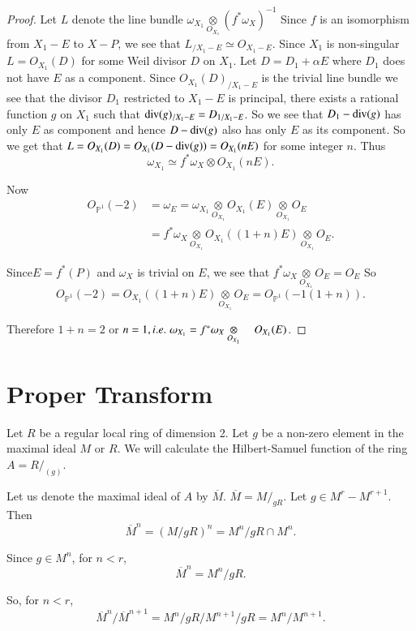 \begin{proof}
Let $L$ denote the line bundle
$\omega_{X_1}\underset{O_{X_1}}{\otimes}(f^*\omega_X)^{-1}$ Since $f$
is an isomorphism from $X_1-E$ to $X-P$, we see that $L_{/X_1-E}\simeq
O_{X_1-E}$. Since $X_1$ is non-singular $L=O_{X_1}(D)$ for some Weil
divisor $D$ on $X_1$. Let $D=D_1+\alpha E$ where $D_1$ does not have
$E$ as a component. Since $O_{X_1}(D)_{/X_1-E}$ is the trivial line
bundle we see that the divisor $D_1$ restricted to $X_1-E$ is
principal, \ie there exists a rational function $g$ on $X_1$ such that
$\operatorname{div}(g)_{/X_1-E}=D_{1/X_1-E}$. So we see that $D_1-\operatorname{div}(g)$ has only
$E$ as component and hence $D-\operatorname{div}(g)$ also has only $E$ as its
component. So we get that $L=O_{X_1}(D)=O_{X_1}(D-\operatorname{div}(g))=O_{X_1}(n
E)$ for some integer $n$. Thus 
$$
\omega_{X_1}\simeq f^*\omega_X\otimes O_{X_1}(n E).
$$

Now 
\begin{align*}
O_{\mathbb{P}^1}(-2) &= \omega_E=\omega_{X_1}\underset{O_{X_1}}
{\otimes} O_{X_1}(E)\underset{O_{X_1}}{\otimes}O_E\\
&= f^*\omega_X\underset{O_{X_1}}{\otimes}O_{X_1}((1+n)E)
\underset{O_{X_1}}{\otimes} O_E.
\end{align*}

Since\pageoriginale $E=f^*(P)$ and $\omega_X$ is trivial on $E$, we
see that $f^*\omega_X\underset{O_{X_1}}{\otimes}O_E=O_E$ So
$$
O_{\mathbb{P}^1}(-2)=O_{X_1}((1+n)E)\underset{O_{X_1}}{\otimes} O_E=
O_{\mathbb{P}^1}(-1(1+n)).
$$

Therefore $1+n=2$ or $n=1, {i.e.}\kern.3em \omega_{X_1}=f^*\omega_X
\underset{O_{X_1}}{\otimes}\quad O_{X_1}(E)$.
\end{proof}

\section{Proper Transform}\label{chap2:sec4}
 Let $R$ be a regular local ring of dimension 2. Let $g$ be a non-zero
 element in the maximal ideal $M$ or $R$. We will calculate the
 Hilbert-Samuel function of the ring $A=R/_{(g)}$. 

Let us denote the maximal ideal of $A$ by
$\overline{M}$. $\overline{M}=M/_{gR}$. Let $g\in M^r-M^{r+1}$. Then
$$
\overline{M}^n=(M/gR)^n=M^n/gR\cap {M^n}.
$$

Since $g\in M^n$, for $n<r$,
$$
\overline{M}^n=M^n/{gR}.
$$

So, for $n<r$,
$$
\overline{M}^n/\overline{M}^{n+1} = M^n/gR \Big/ M^{n+1}/gR=
M^n/M^{n+1}.
$$

